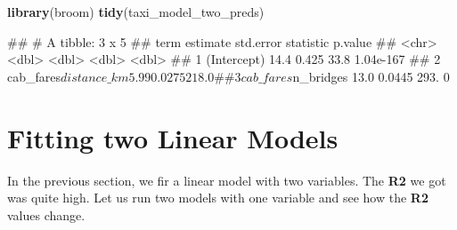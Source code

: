\documentclass[
]{book}
\newenvironment{Shaded}{\begin{snugshade}}{\end{snugshade}}
\newcommand{\FunctionTok}[1]{\textcolor[rgb]{0.13,0.29,0.53}{\textbf{#1}}}
\newcommand{\NormalTok}[1]{#1}
\newcommand{\OtherTok}[1]{\textcolor[rgb]{0.56,0.35,0.01}{#1}}
\newcommand{\SpecialCharTok}[1]{\textcolor[rgb]{0.81,0.36,0.00}{\textbf{#1}}}
\begin{document}
\begin{Shaded}
\begin{Highlighting}[]
\FunctionTok{library}\NormalTok{(broom)}
\FunctionTok{tidy}\NormalTok{(taxi\_model\_two\_preds)}
\end{Highlighting}
\end{Shaded}

\begin{Shaded}
\begin{Highlighting}[]
\NormalTok{\#\# \# A tibble: 3 x 5}
\NormalTok{\#\#   term                  estimate std.error statistic   p.value}
\NormalTok{\#\#   \textless{}chr\textgreater{}                    \textless{}dbl\textgreater{}     \textless{}dbl\textgreater{}     \textless{}dbl\textgreater{}     \textless{}dbl\textgreater{}}
\NormalTok{\#\# 1 (Intercept)              14.4     0.425       33.8 1.04e{-}167}
\NormalTok{\#\# 2 cab\_fares$distance\_km     5.99    0.0275     218.  0        }
\NormalTok{\#\# 3 cab\_fares$n\_bridges      13.0     0.0445     293.  0}
\end{Highlighting}
\end{Shaded}

\hypertarget{fitting-two-linear-models}{%
\section{Fitting two Linear Models}\label{fitting-two-linear-models}}

In the previous section, we fir a linear model with two variables. The \textbf{R2} we got was quite high. Let us run two models with one variable and see how the \textbf{R2} values change.

\begin{Shaded}
\end{Shaded}

\begin{Shaded}
\end{Shaded}
\end{document}
